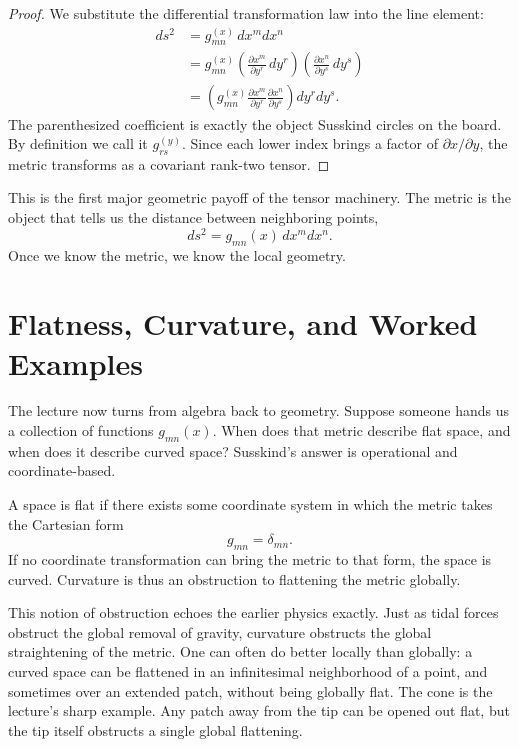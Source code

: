 \begin{proof}
We substitute the differential transformation law into the line element:
\begin{align}
ds^{2}
&=
g^{(x)}_{mn}\,dx^{m}dx^{n} \\
&=
g^{(x)}_{mn}
\left(\frac{\partial x^{m}}{\partial y^{r}}\,dy^{r}\right)
\left(\frac{\partial x^{n}}{\partial y^{s}}\,dy^{s}\right) \\
&=
\left(
g^{(x)}_{mn}
\frac{\partial x^{m}}{\partial y^{r}}
\frac{\partial x^{n}}{\partial y^{s}}
\right)dy^{r}dy^{s}.
\end{align}
The parenthesized coefficient is exactly the object Susskind circles on the board. By definition we call it \(g^{(y)}_{rs}\). Since each lower index brings a factor of \(\partial x/\partial y\), the metric transforms as a covariant rank-two tensor.
\end{proof}

This is the first major geometric payoff of the tensor machinery. The metric is the object that tells us the distance between neighboring points,
\begin{equation}
ds^{2}=g_{mn}(x)\,dx^{m}dx^{n}.
\end{equation}
Once we know the metric, we know the local geometry.

\section{Flatness, Curvature, and Worked Examples}

The lecture now turns from algebra back to geometry. Suppose someone hands us a collection of functions \(g_{mn}(x)\). When does that metric describe flat space, and when does it describe curved space? Susskind's answer is operational and coordinate-based.

\begin{definition}
A space is flat if there exists some coordinate system in which the metric takes the Cartesian form
\[
g_{mn}=\delta_{mn}.
\]
If no coordinate transformation can bring the metric to that form, the space is curved. Curvature is thus an obstruction to flattening the metric globally.
\end{definition}

This notion of obstruction echoes the earlier physics exactly. Just as tidal forces obstruct the global removal of gravity, curvature obstructs the global straightening of the metric. One can often do better locally than globally: a curved space can be flattened in an infinitesimal neighborhood of a point, and sometimes over an extended patch, without being globally flat. The cone is the lecture's sharp example. Any patch away from the tip can be opened out flat, but the tip itself obstructs a single global flattening.

